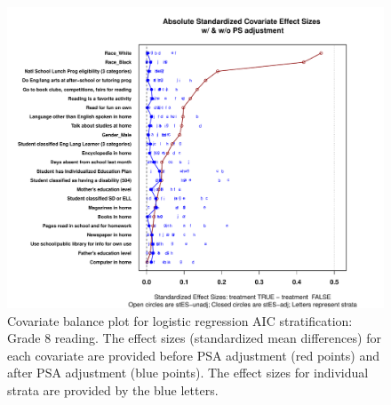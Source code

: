 \begin{figure}
\begin{center}
\includegraphics[width=\textwidth]{../Figures2009/g8read-lrAIC-balance.pdf}
\caption[Covariate balance plot for logistic regression AIC stratification: Grade 8 reading]{Covariate balance plot for logistic regression AIC stratification: Grade 8 reading. The effect sizes (standardized mean differences) for each covariate are provided before PSA adjustment (red points) and after PSA adjustment (blue points). The effect sizes for individual strata are provided by the blue letters.}
\end{center}
\end{figure}

